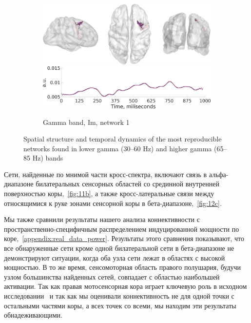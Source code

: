 \begin{figure}
 \begin{subfigure}[b]{0.4\textwidth}
 \includegraphics[width=\textwidth]{../images/psiicos_paper/Figure13_c1.jpg}
 \includegraphics[width=\textwidth]{../images/psiicos_paper/Figure13_c2.jpg}
 \caption{Gamma band, Im, network 1}\label{fig:13c}
 \end{subfigure}
 \caption{Spatial structure and temporal dynamics of the most reproducible
 networks found in lower gamma (30--60 Hz) and higher gamma (65--85 Hz) bands}\label{fig:13}
\end{figure} %

Сети, найденные по мнимой части кросс-спектра, включают связь в альфа-диапазоне
билатеральных сенсорных областей со срединной внутренней поверхностью
коры,~\ref{fig:11b}, а также кросс-латеральные связи между относящимися к руке
зонами сенсорной коры в бета-диапазоне,~\ref{fig:12c}.

Мы также сравнили результаты нашего анализа коннективности с
пространственно-специфичным распределением индуцированной мощности по
коре,~\ref{appendix:real_data_power}. Результаты этого сравнения показывают,
что все обнаруженные сети кроме одной билатеральной сети в бета-диапазоне не
демонстрируют ситуации, когда оба узла сети лежат в областях с высокой
мощностью. В то же время, сенсомоторная область правого полушария, будучи узлом
большинства найденных сетей, совпадает с областью наибольшей активации. Так как
правая мотосенсорная кора играет ключевую роль в исходном
исследовании~\cite{DeLange2008} и так как мы оценивали коннективность не для
одной точки с остальными частями коры, а всех точек со всеми, мы находим эти
результаты обнадеживающими.
